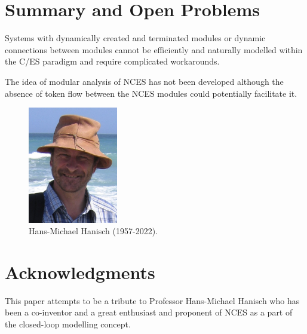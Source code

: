 \begin{bibunit}
\section{Summary and Open Problems}\label{sec:summary}

Systems with dynamically created and terminated modules or dynamic connections between modules cannot be efficiently and naturally modelled within the C/ES paradigm and require complicated workarounds.

The idea of modular analysis of NCES has not been developed although the absence of token flow between the NCES modules could potentially facilitate it.

\begin{figure}
    \centering
    \includegraphics[width=0.35\textwidth]{MX_Papers/Paper1/images/Hanisch.jpg}
    \caption{Hans-Michael Hanisch (1957-2022).}
    \label{fig:Hanisch}
\end{figure}

\section*{Acknowledgments}
This paper attempts to be a tribute to Professor Hans-Michael Hanisch who has been a co-inventor and a great enthusiast and proponent of NCES as a part of the closed-loop modelling concept. 

\putbib
\end{bibunit}
